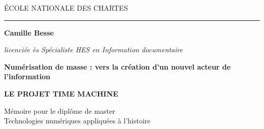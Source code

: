 \begin{titlepage}
		\begin{center}
			
			\bigskip
			
			\begin{large}
				\'ECOLE NATIONALE DES CHARTES
			\end{large}
			\begin{center}\rule{2cm}{0.02cm}\end{center}
			
			\bigskip
			\bigskip
			\bigskip
			\begin{Large}
				\textbf{Camille Besse}\\
			\end{Large}
			\begin{normalsize}
				 \textit{licenciée ès Spécialiste HES en Information documentaire}\\
			\end{normalsize}
			
			\bigskip
			\bigskip
			\bigskip
			
			\begin{Huge}
				\textbf{Numérisation de masse : vers la création d'un nouvel acteur de l'information}\\
			\end{Huge}
			\bigskip
			\bigskip
			\begin{LARGE}
				\textbf{LE PROJET TIME MACHINE}\\
			\end{LARGE}
			
			\bigskip
			\bigskip
			\bigskip
			\begin{large}
			\end{large}
			\vfill
			
			\begin{large}
				Mémoire 
				pour le diplôme de master \\
				\og{} Technologies numériques appliquées à l'histoire \fg{} \\
			\end{large}
			
		\end{center}
	\end{titlepage}
	
\thispagestyle{empty}
\cleardoublepage
